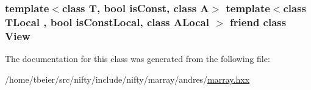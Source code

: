 \subsubsection[{View}]{\setlength{\rightskip}{0pt plus 5cm}template$<$class T, bool is\+Const, class A$>$ template$<$class T\+Local , bool is\+Const\+Local, class A\+Local $>$ friend class {\bf View}\hspace{0.3cm}{\ttfamily [friend]}}\label{classandres_1_1View_a2658181be4befdf722462ab951ba8a67}


The documentation for this class was generated from the following file\+:\begin{DoxyCompactItemize}
\item 
/home/tbeier/src/nifty/include/nifty/marray/andres/\hyperlink{andres_2marray_8hxx}{marray.\+hxx}\end{DoxyCompactItemize}
